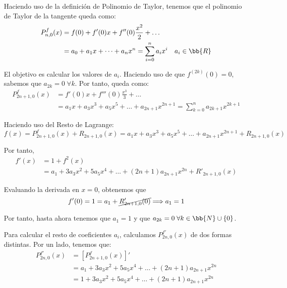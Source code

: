 \begin{ejercicio}
\begin{enumerate}
        Haciendo uso de la definición de Polinomio de Taylor, tenemos que el polinomio de Taylor de la tangente queda como:
        \begin{equation*}\begin{split}
            P_{n,0}^f(x) &= f(0) + f'(0)x + f''(0)\frac{x^2}{2} + \dots \\
            &= a_0 + a_1x + \dots + a_nx^n = \sum_{i=0}^n a_ix^i \quad a_i\in \bb{R}
        \end{split}\end{equation*}

        El objetivo es calcular los valores de $a_i$. Haciendo uso de que $f^{(2k)}(0) = 0$, sabemos que $a_{2k}=0\;\forall k$. Por tanto, queda como:
        \begin{equation*}\begin{split}
            P_{2n+1,0}^f(x) &=  f'(0)x + f'''(0)\frac{x^3}{3} + \dots \\
            &= a_1x + a_3x^3 + a_5x^5 + \dots + a_{2n+1}x^{2n+1} = \sum_{k=0}^n a_{2k+1}x^{2k+1}
        \end{split}\end{equation*}

        Haciendo uso del Resto de Lagrange:
        \begin{equation*}
            f(x) = P_{2n+1,0}^f(x) + R_{2n+1,0}(x) = a_1x + a_3x^3 + a_5x^5 + \dots + a_{2n+1}x^{2n+1} + R_{2n+1,0}(x)
        \end{equation*}

        Por tanto,
        \begin{equation*}\begin{split}
            f'(x) &= 1+f^2(x)\\
            &= a_1 + 3a_3x^2 + 5a_5x^4 + \dots + (2n+1)a_{2n+1}x^{2n} + R'_{2n+1,0}(x)
        \end{split}\end{equation*}

        Evaluando la derivada en $x=0$, obtenemos que $$f'(0)=1 = a_1 +\cancel{R'_{2n+1,0}(0)} \Longrightarrow a_1=1$$

        Por tanto, hasta ahora tenemos que $a_1=1$ y que $a_{2k}=0\;\forall k\in \bb{N}\cup \{0\}$.
        
        Para calcular el resto de coeficientes $a_i$, calculamos $P_{2n,0}^{f'}(x)$ de dos formas distintas. Por un lado, tenemos que:
        \begin{equation}\label{Ec:Ej4.5.Derivada1}
        \begin{split}
            P_{2n,0}^{f'}(x) &= \left[P_{2n+1,0}^f(x)\right]' \\
            &= a_1 + 3a_3x^2 + 5a_5x^4 + \dots + (2n+1)a_{2n+1}x^{2n} \\
            &= 1 + 3a_3x^2 + 5a_5x^4 + \dots + (2n+1)a_{2n+1}x^{2n}
        \end{split}\end{equation}


\end{enumerate}
\end{ejercicio}
